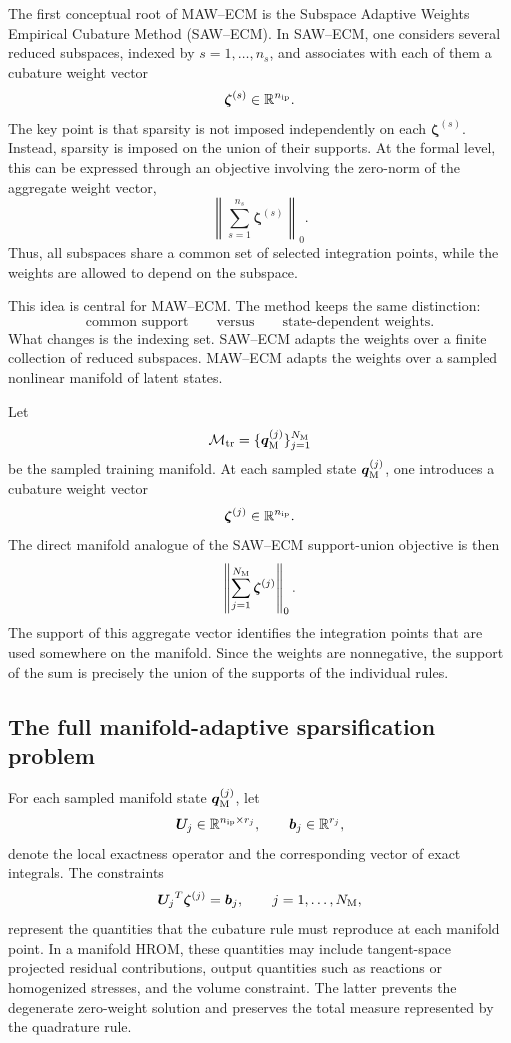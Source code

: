\documentclass[11pt,a4paper]{article}
\begin{document}
The first conceptual root of MAW--ECM is the Subspace Adaptive Weights Empirical
Cubature Method (SAW--ECM). In SAW--ECM, one considers several reduced
subspaces, indexed by $s=1,\ldots,n_s$, and associates with each of them a
cubature weight vector
\[
        \bm\zeta^{(s)}\in\mathbb{R}^{n_{\mathrm{ip}}}.
\]
The key point is that sparsity is not imposed independently on each
$\bm\zeta^{(s)}$. Instead, sparsity is imposed on the union of their supports.
At the formal level, this can be expressed through an objective involving the
zero-norm of the aggregate weight vector,
\[
        \left\|
        \sum_{s=1}^{n_s}\bm\zeta^{(s)}
        \right\|_0.
\]
Thus, all subspaces share a common set of selected integration points, while
the weights are allowed to depend on the subspace.

This idea is central for MAW--ECM. The method keeps the same distinction:
\[
        \text{common support}
        \qquad\text{versus}\qquad
        \text{state-dependent weights}.
\]
What changes is the indexing set. SAW--ECM adapts the weights over a finite
collection of reduced subspaces. MAW--ECM adapts the weights over a sampled
nonlinear manifold of latent states.

Let
\[
        \mathcal{M}_{\mathrm{tr}}=\{\bm q_{\mathrm{M}}^{(j)}\}_{j=1}^{N_{\mathrm{M}}}
\]
be the sampled training manifold. At each sampled state $\bm q_{\mathrm{M}}^{(j)}$, one introduces
a cubature weight vector
\[
        \bm\zeta^{(j)}\in\mathbb{R}^{n_{\mathrm{ip}}}.
\]
The direct manifold analogue of the SAW--ECM support-union objective is then
\[
        \left\|
        \sum_{j=1}^{N_{\mathrm{M}}}\bm\zeta^{(j)}
        \right\|_0.
        \label{eq:intro_support_union_full}
\]
The support of this aggregate vector identifies the integration points that are
used somewhere on the manifold. Since the weights are nonnegative, the support
of the sum is precisely the union of the supports of the individual rules.

\subsection{The full manifold-adaptive sparsification problem}

For each sampled manifold state $\bm q_{\mathrm{M}}^{(j)}$, let
\[
        \bm U_j\in\mathbb{R}^{n_{\mathrm{ip}}\times r_j},
        \qquad
        \bm b_j\in\mathbb{R}^{r_j},
\]
denote the local exactness operator and the corresponding vector of exact
integrals. The constraints
\[
        {\bm U_j}^T\bm\zeta^{(j)}=\bm b_j,
        \qquad
        j=1,\ldots,N_{\mathrm{M}},
        \label{eq:intro_full_exactness}
\]
represent the quantities that the cubature rule must reproduce at each
manifold point. In a manifold HROM, these quantities may include tangent-space
projected residual contributions, output quantities such as reactions or
homogenized stresses, and the volume constraint. The latter prevents the
degenerate zero-weight solution and preserves the total measure represented by
the quadrature rule.
\end{document}
